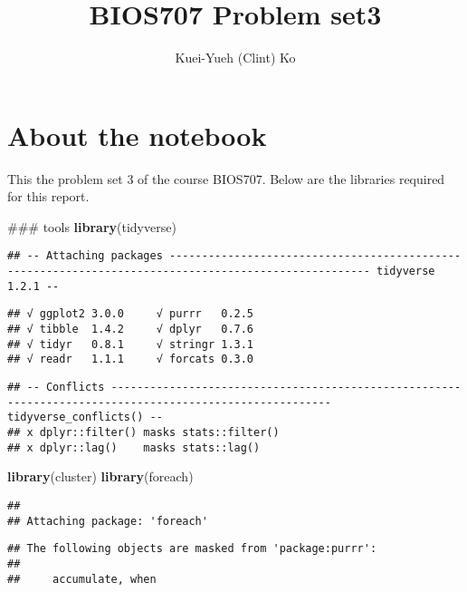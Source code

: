 \documentclass[]{article}
\title{BIOS707 \textbar{} Problem set3}
\author{Kuei-Yueh (Clint) Ko}
\date{}
\newenvironment{Shaded}{\begin{snugshade}}{\end{snugshade}}
\newcommand{\KeywordTok}[1]{\textcolor[rgb]{0.13,0.29,0.53}{\textbf{#1}}}
\newcommand{\NormalTok}[1]{#1}
\begin{document}
\maketitle

{
\setcounter{tocdepth}{2}
\tableofcontents
}
\section{About the notebook}\label{about-the-notebook}

This the problem set 3 of the course BIOS707. Below are the libraries
required for this report.

\begin{Shaded}
\begin{Highlighting}[]
\NormalTok{### tools}
\KeywordTok{library}\NormalTok{(tidyverse)}
\end{Highlighting}
\end{Shaded}

\begin{verbatim}
## -- Attaching packages ----------------------------------------------------------------------------------------------------- tidyverse 1.2.1 --
\end{verbatim}

\begin{verbatim}
## √ ggplot2 3.0.0     √ purrr   0.2.5
## √ tibble  1.4.2     √ dplyr   0.7.6
## √ tidyr   0.8.1     √ stringr 1.3.1
## √ readr   1.1.1     √ forcats 0.3.0
\end{verbatim}

\begin{verbatim}
## -- Conflicts -------------------------------------------------------------------------------------------------------- tidyverse_conflicts() --
## x dplyr::filter() masks stats::filter()
## x dplyr::lag()    masks stats::lag()
\end{verbatim}

\begin{Shaded}
\begin{Highlighting}[]
\KeywordTok{library}\NormalTok{(cluster)}
\KeywordTok{library}\NormalTok{(foreach)}
\end{Highlighting}
\end{Shaded}

\begin{verbatim}
## 
## Attaching package: 'foreach'
\end{verbatim}

\begin{verbatim}
## The following objects are masked from 'package:purrr':
## 
##     accumulate, when
\end{verbatim}
\end{document}
